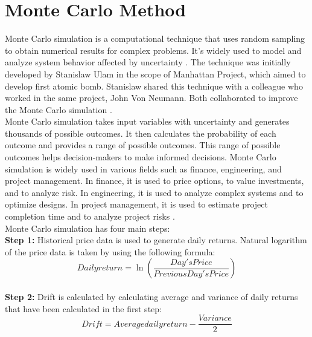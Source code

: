 \documentclass[12pt, a4paper]{article}
\begin{document}
\section{Monte Carlo Method}
Monte Carlo simulation is a computational technique that uses random sampling to obtain numerical results for complex problems. It’s widely used to model and analyze system behavior affected by uncertainty \cite{1}.  The technique was initially developed by Stanislaw Ulam in the scope of Manhattan Project, which aimed to develop first atomic bomb.  Stanislaw shared this technique with a colleague who worked in the same project, John Von Neumann.  Both collaborated to improve the Monte Carlo simulation \cite{1}.\\

Monte Carlo simulation takes input variables with uncertainty and generates thousands of possible outcomes.  It then calculates the probability of each outcome and provides a range of possible outcomes.  This range of possible outcomes helps decision-makers to make informed decisions.  Monte Carlo simulation is widely used in various fields such as finance, engineering, and project management.  In finance, it is used to price options, to value investments, and to analyze risk.  In engineering, it is used to analyze complex systems and to optimize designs.  In project management, it is used to estimate project completion time and to analyze project risks \cite{1}.\\

Monte Carlo simulation has four main steps:\\

\textbf{Step 1:} Historical price data is used to generate daily returns.  Natural logarithm of the price data is taken by using the following formula:\\

\begin{equation} \label{eq1}
Daily return = \ln \left(\frac{Day's Price}{Previous Day's Price}\right)\end{equation}\\

\textbf{Step 2:} Drift is calculated by calculating average and variance of daily returns that have been calculated in the first step:\\

\begin{equation} \label{eq2}
Drift = Average daily return - \frac{Variance}{2}
\end{equation}\\
\end{document}
